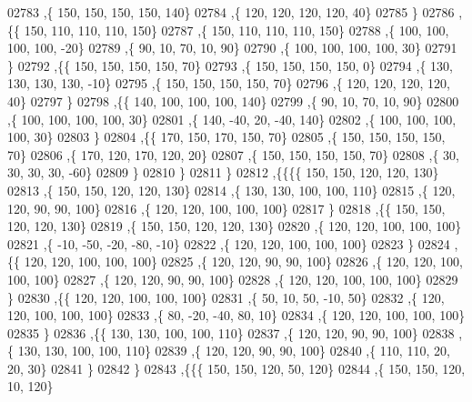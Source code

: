 \begin{DoxyCode}
02783     ,\{   150,   150,   150,   150,   140\}
02784     ,\{   120,   120,   120,   120,    40\}
02785     \}
02786    ,\{\{   150,   110,   110,   110,   150\}
02787     ,\{   150,   110,   110,   110,   150\}
02788     ,\{   100,   100,   100,   100,   -20\}
02789     ,\{    90,    10,    70,    10,    90\}
02790     ,\{   100,   100,   100,   100,    30\}
02791     \}
02792    ,\{\{   150,   150,   150,   150,    70\}
02793     ,\{   150,   150,   150,   150,     0\}
02794     ,\{   130,   130,   130,   130,   -10\}
02795     ,\{   150,   150,   150,   150,    70\}
02796     ,\{   120,   120,   120,   120,    40\}
02797     \}
02798    ,\{\{   140,   100,   100,   100,   140\}
02799     ,\{    90,    10,    70,    10,    90\}
02800     ,\{   100,   100,   100,   100,    30\}
02801     ,\{   140,   -40,    20,   -40,   140\}
02802     ,\{   100,   100,   100,   100,    30\}
02803     \}
02804    ,\{\{   170,   150,   170,   150,    70\}
02805     ,\{   150,   150,   150,   150,    70\}
02806     ,\{   170,   120,   170,   120,    20\}
02807     ,\{   150,   150,   150,   150,    70\}
02808     ,\{    30,    30,    30,    30,   -60\}
02809     \}
02810    \}
02811   \}
02812  ,\{\{\{\{   150,   150,   120,   120,   130\}
02813     ,\{   150,   150,   120,   120,   130\}
02814     ,\{   130,   130,   100,   100,   110\}
02815     ,\{   120,   120,    90,    90,   100\}
02816     ,\{   120,   120,   100,   100,   100\}
02817     \}
02818    ,\{\{   150,   150,   120,   120,   130\}
02819     ,\{   150,   150,   120,   120,   130\}
02820     ,\{   120,   120,   100,   100,   100\}
02821     ,\{   -10,   -50,   -20,   -80,   -10\}
02822     ,\{   120,   120,   100,   100,   100\}
02823     \}
02824    ,\{\{   120,   120,   100,   100,   100\}
02825     ,\{   120,   120,    90,    90,   100\}
02826     ,\{   120,   120,   100,   100,   100\}
02827     ,\{   120,   120,    90,    90,   100\}
02828     ,\{   120,   120,   100,   100,   100\}
02829     \}
02830    ,\{\{   120,   120,   100,   100,   100\}
02831     ,\{    50,    10,    50,   -10,    50\}
02832     ,\{   120,   120,   100,   100,   100\}
02833     ,\{    80,   -20,   -40,    80,    10\}
02834     ,\{   120,   120,   100,   100,   100\}
02835     \}
02836    ,\{\{   130,   130,   100,   100,   110\}
02837     ,\{   120,   120,    90,    90,   100\}
02838     ,\{   130,   130,   100,   100,   110\}
02839     ,\{   120,   120,    90,    90,   100\}
02840     ,\{   110,   110,    20,    20,    30\}
02841     \}
02842    \}
02843   ,\{\{\{   150,   150,   120,    50,   120\}
02844     ,\{   150,   150,   120,    10,   120\}

\end{DoxyCode}
